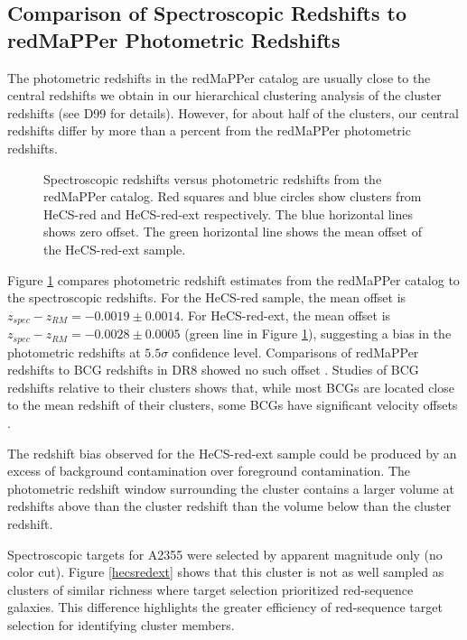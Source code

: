 \subsection{Comparison of Spectroscopic Redshifts to redMaPPer Photometric Redshifts}



The photometric redshifts in the redMaPPer catalog are usually close to the central 
redshifts we obtain in our hierarchical clustering analysis of the cluster 
redshifts (see D99 for details).  However, for about half of the clusters,
our central redshifts differ by more than a percent from the redMaPPer photometric redshifts.  

\begin{figure} 
\caption{\label{hecsredzphotz} Spectroscopic redshifts versus photometric redshifts from the redMaPPer catalog.
Red squares and blue circles show clusters from HeCS-red and HeCS-red-ext respectively.  
The blue horizontal lines shows zero offset. The green horizontal line shows the mean offset of the HeCS-red-ext sample.
}
\end{figure}

Figure \ref{hecsredzphotz} compares photometric redshift estimates from the 
redMaPPer catalog to the spectroscopic redshifts.  For the HeCS-red sample, 
the mean offset is $z_{spec}-z_{RM}=-0.0019\pm0.0014$.  For HeCS-red-ext, 
the mean offset is $z_{spec}-z_{RM}=-0.0028\pm0.0005$ (green line in 
Figure \ref{hecsredzphotz}), suggesting a bias in the photometric redshifts 
at $5.5\sigma$ confidence level.  Comparisons of redMaPPer redshifts to 
BCG redshifts in DR8 showed no such offset \citep{rykoff14}.  Studies of BCG 
redshifts relative to their clusters shows that, while most BCGs are located 
close to the mean redshift of their clusters, some BCGs have significant 
velocity offsets \citep[e.g.,][]{lauer14}.

The redshift bias observed for the HeCS-red-ext sample could be produced 
by an excess of background contamination over foreground contamination.  
The photometric redshift window surrounding the cluster contains a larger volume
at redshifts above than the cluster redshift than the volume below than the 
cluster redshift.  
 

Spectroscopic targets for A2355 were selected by apparent magnitude only (no color cut).  
Figure \ref{hecsredext} shows that this cluster is not as well sampled 
as clusters of similar richness where target selection prioritized red-sequence galaxies. 
This difference highlights the greater efficiency of red-sequence target selection for 
identifying cluster members. 
 
